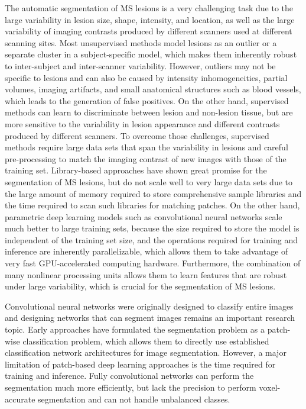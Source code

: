 The automatic segmentation of MS lesions is a very challenging task due to the
large variability in lesion size, shape, intensity, and location, as well as the
large variability of imaging contrasts produced by different scanners used at
different scanning sites. Most unsupervised methods model lesions as an outlier
or a separate cluster in a subject-specific model, which makes them inherently
robust to inter-subject and inter-scanner variability. However, outliers may not be
specific to lesions and can also be caused by intensity inhomogeneities, partial
volumes, imaging artifacts, and small anatomical structures such as blood
vessels, which leads to the generation of false positives. On the other hand,
supervised methods can learn to discriminate between lesion and non-lesion
tissue, but are more sensitive to the variability in lesion appearance and
different contrasts produced by different scanners. To overcome those
challenges, supervised methods require large data sets that span the variability
in lesions and careful pre-processing to match the imaging contrast of new
images with those of the training set. Library-based approaches have shown great
promise for the segmentation of MS lesions, but do not scale well to very large
data sets due to the large amount of memory required to store comprehensive
sample libraries and the time required to scan such libraries for matching
patches. On the other hand, parametric deep learning models such as
convolutional neural networks scale much better to large training sets, because
the size required to store the model is independent of the training set size,
and the operations required for training and inference are inherently
parallelizable, which allows them to take advantage of very fast GPU-accelerated
computing hardware. Furthermore, the combination of many nonlinear processing
units allows them to learn features that are robust under large variability,
which is crucial for the segmentation of MS lesions.

Convolutional neural networks were originally designed to classify entire images
and designing networks that can segment images remains an important research
topic. Early approaches have formulated the segmentation problem as a patch-wise
classification problem, which allows them to directly use established
classification network architectures for image segmentation.
However, a major limitation of patch-based deep learning approaches is the time
required for training and inference. Fully convolutional networks can perform
the segmentation much more efficiently, but lack the precision to perform
voxel-accurate segmentation and can not handle unbalanced classes.

